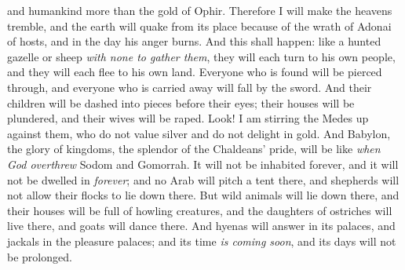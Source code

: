 \begin{biblechapter}
and humankind more than the gold of Ophir.
\verse Therefore I will make the heavens tremble, 
and the earth will quake from its place 
because of the wrath of Adonai of hosts, 
and in the day his anger burns.
\verse And this shall happen:
\verse like a hunted gazelle or sheep \textit{with none to gather them}, 
they will each turn to his own people, 
and they will each flee to his own land.
\verse Everyone who is found will be pierced through, 
and everyone who is carried away will fall by the sword.
\verse And their children will be dashed into pieces before their eyes; 
their houses will be plundered, and their wives will be raped.
\verse Look! I am stirring the Medes up against them, 
who do not value silver 
and do not delight in gold.
\verse And Babylon, the glory of kingdoms, the splendor of the Chaldeans’ pride, will be like \textit{when God overthrew} Sodom and Gomorrah.
\verse It will not be inhabited forever, 
and it will not be dwelled in \textit{forever}; 
and no Arab will pitch a tent there, 
and shepherds will not allow their flocks to lie down there.
\verse But wild animals will lie down there, 
and their houses will be full of howling creatures, 
and the daughters of ostriches will live there, 
and goats will dance there.
\verse And hyenas will answer in its palaces, 
and jackals in the pleasure palaces; 
and its time \textit{is coming soon}, 
and its days will not be prolonged.
\end{biblechapter}

